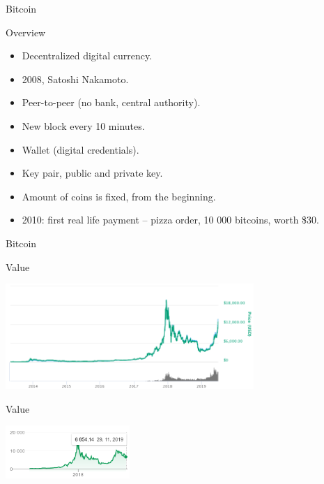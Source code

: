 
\begin{frame}{Bitcoin}
  \begin{block}{Overview}
    \begin{itemize}
      \item Decentralized digital currency.
      \item 2008, Satoshi Nakamoto.
      \item Peer-to-peer (no bank, central authority). 
      \item New block every 10 minutes.
      \item Wallet (digital credentials).
      \item Key pair, public and private key.
      \item Amount of coins is fixed, from the beginning.
      \item 2010: first real life payment -- pizza order, 10 000 bitcoins, worth \$30.
    \end{itemize}
  \end{block}
\end{frame}

\begin{frame}{Bitcoin}
  \begin{block}{Value}
    \begin{center}
      \includegraphics[height=4cm]{img/price.png}
    \end{center}
  \end{block}
  \begin{block}{Value}
    \begin{center}
      \includegraphics[height=2cm]{img/price-now.png}
    \end{center}
  \end{block}
\end{frame}


